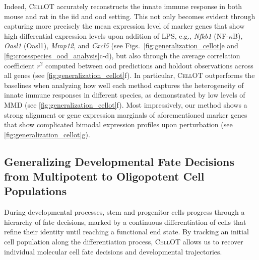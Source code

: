 Indeed, \textsc{CellOT} accurately reconstructs the innate immune response in both mouse and rat in the \acrshort{iid} and \acrshort{ood} setting. This not only becomes evident through capturing more precisely the mean expression level of marker genes that show high differential expression levels upon addition of \acrshort{LPS}, e.g., \textit{Nfkb1} (NF-$\kappa$B), \textit{Oasl1} (Oasl1), \textit{Mmp12}, and \textit{Cxcl5} (see Figs.~\ref{fig:generalization_cellot}e and \ref{fig:crossspecies_ood_analysis}c-d), but also through the average correlation coefficient $r^2$ computed between \acrshort{ood} predictions and holdout observations across all genes (see \cref{fig:generalization_cellot}f).
In particular, \textsc{CellOT} outperforms the baselines when analyzing how well each method captures the heterogeneity of innate immune responses in different species, as demonstrated by low levels of \acrshort{MMD} (see \cref{fig:generalization_cellot}f).
Most impressively, our method shows a strong alignment or gene expression marginals of aforementioned marker genes that show complicated bimodal expression profiles upon perturbation (see \cref{fig:generalization_cellot}g).


\subsection{Generalizing Developmental Fate Decisions from Multipotent to Oligopotent Cell Populations}

 During developmental processes, stem and progenitor cells progress through a hierarchy of fate decisions, marked by a continuous differentiation of cells that refine their identity until reaching a functional end state.
By tracking an initial cell population along the differentiation process, \textsc{CellOT} allows us to recover individual molecular cell fate decisions and developmental trajectories. 

